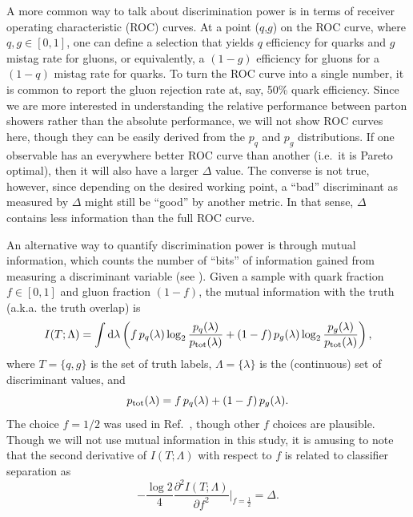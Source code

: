 \documentclass[11pt]{cernrep}
\begin{document}
A more common way to talk about discrimination power is in terms of receiver operating characteristic (ROC) curves.  At a point ($q$,$g$) on the ROC curve, where $q,g \in [0,1]$, one can define a selection that yields $q$ efficiency for quarks and $g$ mistag rate for gluons, or equivalently, a $(1-g)$ efficiency for gluons for a $(1-q)$ mistag rate for quarks.  To turn the ROC curve into a single number, it is common to report the gluon rejection rate at, say, 50\% quark efficiency.  Since we are more interested in understanding the relative performance between parton showers rather than the absolute performance, we will not show ROC curves here, though they can be easily derived from the $p_q$ and $p_g$ distributions.  If one observable has an everywhere better ROC curve than another (i.e.~it is Pareto optimal), then it will also have a larger $\Delta$ value.  The converse is not true, however, since depending on the desired working point, a ``bad'' discriminant as measured by $\Delta$ might still be ``good'' by another metric.  In that sense, $\Delta$ contains less information than the full ROC curve.

An alternative way to quantify discrimination power is through mutual information, which counts the number of ``bits'' of information gained from measuring a discriminant variable (see \cite{Larkoski:2014pca}).  Given a sample with quark fraction $f \in [0,1]$ and gluon fraction $(1-f)$, the mutual information with the truth (a.k.a. the truth overlap) is
\begin{equation}
I(T; \Lambda) = \int \text{d} \lambda \left(f \, p_q(\lambda) \log_2 \frac{p_q(\lambda)}{p_{\rm tot}(\lambda)} + (1-f) \, p_g(\lambda) \log_2 \frac{p_g(\lambda)}{p_{\rm tot}(\lambda)}   \right),
\end{equation}
where $T = \{q,g\}$ is the set of truth labels, $\Lambda = \{\lambda\}$ is the (continuous) set of discriminant values, and 
\begin{equation}
p_{\rm tot}(\lambda) = f \, p_q(\lambda) + (1-f) \, p_g(\lambda).
\end{equation}
The choice $f = 1/2$ was used in Ref.~\cite{Larkoski:2014pca}, though other $f$ choices are plausible.  Though we will not use mutual information in this study, it is amusing to note that the second derivative of $I(T;\Lambda)$ with respect to $f$ is related to classifier separation as
\begin{equation}
\label{quarkgluon_eq:altdeltadef}
- \frac{\log 2}{4} \frac{\partial^2 I(T;\Lambda)}{\partial f^2} \Big|_{f = \frac{1}{2}} = \Delta.
\end{equation}
\end{document}
